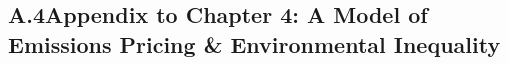 



\newpage
\subsection*{A.4\quad Appendix to Chapter 4: A Model of Emissions Pricing \& Environmental Inequality}


